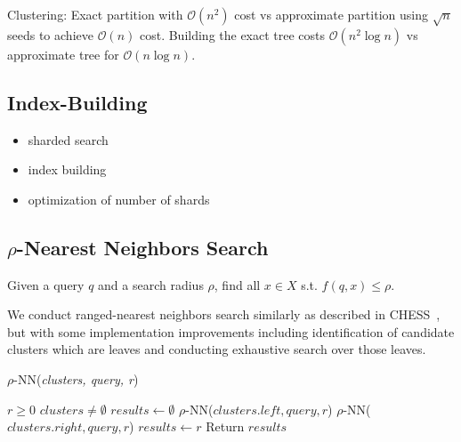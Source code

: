Clustering: Exact partition with $\mathcal{O}(n^2)$ cost vs approximate partition using $\sqrt{n}$ seeds to achieve $\mathcal{O}(n)$ cost.
Building the exact tree costs $\mathcal{O}(n^2 \log n)$ vs approximate tree for $\mathcal{O}(n \log n)$.


\subsection {Index-Building}
\begin{itemize}
    \item sharded search 
    \item index building 
    \item optimization of number of shards 
\end{itemize}

\subsection{\texorpdfstring{$\rho$}{p}-Nearest Neighbors Search}
\label{subsec:methods:rnn-search}

Given a query $q$ and a search radius $\rho$, find all $x \in X$ s.t. $f(q, x) \leq \rho$.

We conduct ranged-nearest neighbors search similarly as described in CHESS~\cite{ishaq2019clustered}, but 
with some implementation improvements including identification of candidate clusters which are leaves and 
conducting exhaustive search over those leaves.

\begin{algorithm} 
    \caption{$\rho$-NN(\emph{clusters, query, r})} 
    \label{alg:rnn} 
    \begin{algorithmic}[2]
        \REQUIRE $r \geq 0$
        \REQUIRE $clusters \neq \emptyset$
        \STATE $results \leftarrow \emptyset$
                \STATE $\rho$-NN($clusters.left, query, r$)
            \ENDIF
        \ENDIF
                \STATE $\rho$-NN($clusters.right, query, r$)
            \ENDIF
        \ENDIF
                    \STATE $results \leftarrow r$
                \ENDIF
            \ENDFOR
        \ENDIF
        \STATE Return $results$
    \end{algorithmic}
    \end{algorithm}

